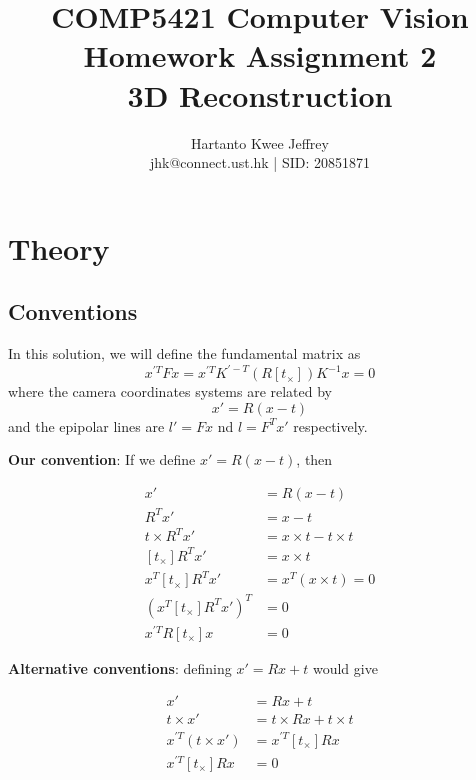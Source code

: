 \documentclass{article} %
\title{\large COMP5421 Computer Vision
\\ \huge Homework Assignment 2
\\ \huge 3D Reconstruction}
\author{Hartanto Kwee Jeffrey\\
    \normalsize jhk@connect.ust.hk | SID: 20851871} %
\date{}
\begin{document}
    \maketitle %
    
    \section[1]{Theory} %

    \subsection*{Conventions}

    In this solution, we will define the fundamental matrix as 
    \begin{equation*}
    x^{'T}Fx=x^{'T}K^{'-T}\left(R\left[t_{\times }\right]\right)K^{-1}x=0
    \end{equation*}
    where the camera coordinates systems are related by
    \begin{equation*}
    x'=R(x-t)
    \end{equation*}
    and the epipolar lines are $l'=Fx$ nd $l=F^{T}x'$ respectively.
    \smallskip

    \textbf{Our convention}: If we define $x'=R(x-t)$, then

    \begin{align*}
    x'&=R\left(x-t\right) \\
    R^{T}x'&=x-t \\
    t\times R^{T}x'&=x\times t-t\times t \\
    \left[t_{\times }\right]R^{T}x'&=x\times t \\
    x^{T}\left[t_{\times }\right]R^{T}x'&=x^{T}\left(x\times t\right)=0 \\
    \left(x^{T}\left[t_{\times }\right]R^{T}x'\right)^{T}&=0 \\
    x^{'T}R\left[t_{\times }\right]x&=0 
    \end{align*}

    \textbf{Alternative conventions}: defining $x'=Rx+t$ would give

    \begin{align*}
    x'&=Rx+t \\
    t\times x'&=t\times Rx+t\times t \\
    x^{'T}\left(t\times x'\right)&=x^{'T}\left[t_{\times }\right]Rx \\
    x^{'T}\left[t_{\times }\right]Rx&=0 
    \end{align*}
\end{document}
